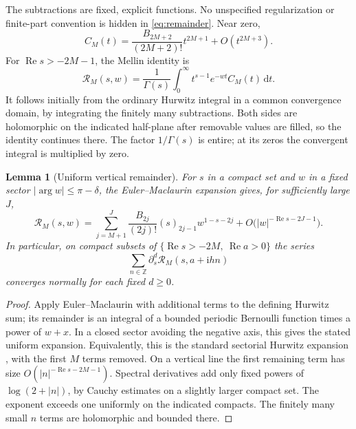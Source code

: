 \documentclass[11pt,a4paper]{article}
\numberwithin{equation}{section}
\newtheorem{lemma}[theorem]{Lemma}
\theoremstyle{definition}
\theoremstyle{remark}
\DeclareMathOperator{\Ree}{Re}
\newcommand{\dd}{\,\mathrm d}
\newcommand{\ii}{\mathrm i}
\newcommand{\Z}{\mathbb Z}
\newcommand{\Rcal}{\mathcal R}
\begin{document}
The subtractions are fixed, explicit functions. No unspecified
regularization or finite-part convention is hidden in
\eqref{eq:remainder}. Near zero,
\begin{equation}\label{eq:kernel-origin}
 C_M(t)=\frac{B_{2M+2}}{(2M+2)!}t^{2M+1}+O(t^{2M+3}).
\end{equation}
For $\Ree s>-2M-1$, the Mellin identity is
\begin{equation}\label{eq:mellin}
 \Rcal_M(s,w)=\frac1{\Gamma(s)}
       \int_0^\infty t^{s-1}e^{-wt}C_M(t)\dd t.
\end{equation}
It follows initially from the ordinary Hurwitz integral in a common
convergence domain, by integrating the finitely many subtractions.
Both sides are holomorphic on the indicated half-plane after removable
values are filled, so the identity continues there. The factor
$1/\Gamma(s)$ is entire; at its zeros the convergent integral is
multiplied by zero.

\begin{lemma}[Uniform vertical remainder]\label{lem:vertical}
For $s$ in a compact set and $w$ in a fixed sector
$|\arg w|\le\pi-\delta$, the Euler--Maclaurin expansion gives, for
sufficiently large $J$,
\begin{equation}\label{eq:em-asymptotic}
 \Rcal_M(s,w)=
 \sum_{j=M+1}^{J}\frac{B_{2j}}{(2j)!}(s)_{2j-1}w^{1-s-2j}
 +O\bigl(|w|^{-\Ree s-2J-1}\bigr).
\end{equation}
In particular, on compact subsets of
$\{\Ree s>-2M,\ \Ree a>0\}$ the series
\[
 \sum_{n\in\Z}\partial_s^d\Rcal_M(s,a+\ii hn)
\]
converges normally for each fixed $d\ge0$.
\end{lemma}
\begin{proof}
Apply Euler--Maclaurin with additional terms to the defining Hurwitz
sum; its remainder is an integral of a bounded periodic Bernoulli
function times a power of $w+x$. In a closed sector avoiding the
negative axis, this gives the stated uniform expansion. Equivalently,
this is the standard sectorial Hurwitz expansion
\cite[\S25.11(xii)]{DLMF25}, with the first $M$ terms removed.
On a vertical line the first remaining term has size
$O(|n|^{-\Ree s-2M-1})$. Spectral derivatives add only fixed powers
of $\log(2+|n|)$, by Cauchy estimates on a slightly larger compact
set. The exponent exceeds one uniformly on the indicated compacts.
The finitely many small $n$ terms are holomorphic and bounded there.
\end{proof}
\end{document}
